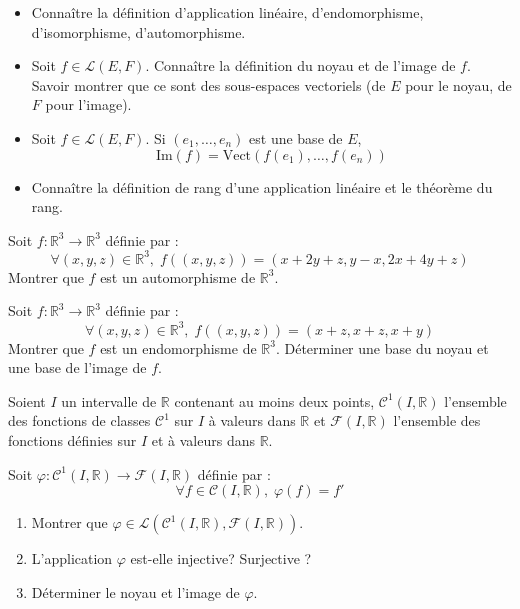 \documentclass[a4paper,twoside,french,11pt]{VcCours}
\begin{document}
\begin{ptc}{}

\begin{itemize}
\item Connaître la définition d'application linéaire, d'endomorphisme, d'isomorphisme, d'automorphisme.
\item Soit $f \in \mathcal{L}(E,F)$. Connaître la définition du noyau et de l'image de $f$. Savoir montrer que ce sont des sous-espaces vectoriels (de $E$ pour le noyau, de $F$ pour l'image).
\item Soit $f \in \mathcal{L}(E,F)$. Si $(e_1, \ldots, e_n)$ est une base de $E$,
$$ \textrm{Im}(f) = \textrm{Vect}(f(e_1), \ldots, f(e_n))$$
\item Connaître la définition de rang d'une application linéaire et le théorème du rang.
\end{itemize} 
\end{ptc}
%

\begin{Exercice}{}
  Soit $f : \mathbb{R}^3 \rightarrow \mathbb{R}^3$ définie par :
  $$ \forall (x,y,z) \in \mathbb{R}^3, \; f((x,y,z))= (x+2y+z,y-x,2x+4y+z)$$
  Montrer que $f$ est un automorphisme de $\mathbb{R}^3$.
\end{Exercice} 

\begin{Exercice}{}
  Soit $f : \mathbb{R}^3 \rightarrow \mathbb{R}^3$ définie par :
  $$ \forall (x,y,z) \in \mathbb{R}^3, \; f((x,y,z))= (x+z,x+z,x+y)$$
  Montrer que $f$ est un endomorphisme de $\mathbb{R}^3$. Déterminer une base du noyau et une base de l'image de $f$.
\end{Exercice} 

\begin{Exercice}{}
  Soient $I$ un intervalle de $\mathbb{R}$ contenant au moins deux points,  $\mathcal{C}^1(I, \mathbb{R})$ l'ensemble des fonctions de classes $\mathcal{C}^1$ sur $I$ à valeurs dans $\mathbb{R}$ et $\mathcal{F}(I, \mathbb{R})$ l'ensemble des fonctions définies sur $I$ et à valeurs dans $\mathbb{R}$. 
  
  Soit $\varphi : \mathcal{C}^1(I, \mathbb{R}) \rightarrow \mathcal{F}(I, \mathbb{R})$ définie par :
  $$ \forall f \in \mathcal{C}(I, \mathbb{R}), \; \varphi(f)=f'$$
  
  \begin{enumerate}
    \item Montrer que $\varphi \in \mathcal{L}(\mathcal{C}^1(I, \mathbb{R}),\mathcal{F}(I, \mathbb{R}))$.
    \item L'application $\varphi$ est-elle injective? Surjective ?
    \item Déterminer le noyau et l'image de $\varphi$.
  \end{enumerate}
\end{Exercice} 
\end{document}
